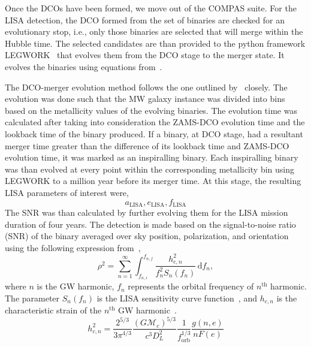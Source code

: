 \documentclass[journal, twocolumn]{IEEEtran}
\newcommand{\semaxis}[1]{a_{\text{#1}}}
\newcommand{\ecc}[1]{e_\text{#1}}
\begin{document}
    Once the DCOs have been formed, we move out of the COMPAS suite.
    For the LISA detection, the DCO formed from the set of binaries are checked for an evolutionary stop, i.e., only those binaries are selected that will merge within the Hubble time.
    The selected candidates are than provided to the python framework LEGWORK~\cite{wagg2021legwork} that evolves them from the DCO stage to the merger state.
    It evolves the binaries using equations from~\cite{Peters1963, Peters1964}.

    The DCO-merger evolution method follows the one outlined by~\cite{wagg2021gravitational} closely.
    The evolution was done such that the MW galaxy instance was divided into bins based on the metallicity values of the evolving binaries.
    The evolution time was calculated after taking into consideration the ZAMS-DCO evolution time and the lookback time of the binary produced.
    If a binary, at DCO stage, had a resultant merger time greater than the difference of its lookback time and ZAMS-DCO evolution time, it was marked as an inspiralling binary.
    Each inspiralling binary was than evolved at every point within the corresponding metallicity bin using LEGWORK to a million year before its merger time.
    At this stage, the resulting LISA parameters of interest were,
    \begin{equation}%
        \semaxis{LISA}, \ecc{LISA}, f_{\text{LISA}}
        \label{eq:lisa_parameter_names}
    \end{equation}%
    The SNR was than calculated by further evolving them for the LISA mission duration of four years. The detection is made based on the signal-to-noise ratio (SNR) of the binary averaged over sky position, polarization, and orientation using the following expression from~\cite{Finn2000},
    \begin{equation}
    \rho^2 = \sum_{n=1}^{\infty}\int_{f_{n, i}}^{f_{n, f}}\frac{h_{c, n}^2}{f_n^2 S_n(f_n)}\,\text{d}f_n,
    \label{eq:snr_equation}
    \end{equation}
    where $n$ is the GW harmonic, $f_n$ represents the orbital frequency of $n^\text{th}$ harmonic.
    The parameter $S_n(f_n)$ is the LISA sensitivity curve function~\cite{Robson2019}, and $h_{c, n}$ is the characteristic strain of the $n^\text{th}$ GW harmonic~\cite{Barack2004}.
    \begin{equation}
    h_{c,n}^2 = \frac{2^{5/3}}{3\pi^{4/3}}\frac{(G\mathcal{M}_c)^{5/3}}{c^3 D_L^2}\frac{1}{f_\text{orb}^{1/3}}\frac{g(n, e)}{nF(e)}
    \label{eq:characteristic_strain}
    \end{equation}
    
\end{document}
